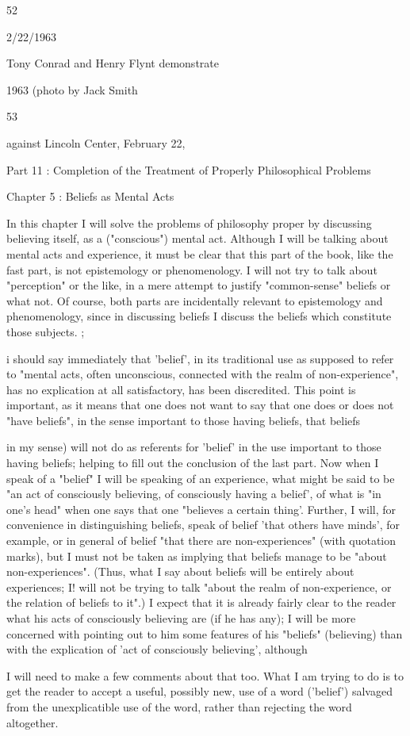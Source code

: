 \documentclass[10pt,twoside]{memoir}
\begin{document}
\begin{enumerate}
{{{{{{{{{{{{{{52 


2/22/1963 


Tony Conrad and Henry Flynt demonstrate 


1963 
(photo by Jack Smith} 


53 


against Lincoln Center, February 22, 


Part 11 : Completion of the Treatment of 
Properly Philosophical Problems 


Chapter 5 : Beliefs as Mental Acts 


In this chapter I will solve the problems of philosophy proper by 
discussing believing itself, as a ("conscious") mental act. Although I will be 
talking about mental acts and experience, it must be clear that this part of 
the book, like the fast part, is not epistemology or phenomenology. I will 
not try to talk about "perception" or the like, in a mere attempt to justify 
"common-sense" beliefs or what not. Of course, both parts are incidentally 
relevant to epistemology and phenomenology, since in discussing beliefs I 
discuss the beliefs which constitute those subjects. ; 

i should say immediately that 'belief', in its traditional use as supposed 
to refer to "mental acts, often unconscious, connected with the realm of 
non-experience", has no explication at all satisfactory, has been discredited. 
This point is important, as it means that one does not want to say that one 
does or does not "have beliefs", in the sense important to those having 
beliefs, that beliefs {in my sense) will not do as referents for 'belief' in the 
use important to those having beliefs; helping to fill out the conclusion of 
the last part. Now when I speak of a "belief" I will be speaking of an 
experience, what might be said to be "an act of consciously believing, of 
consciously having a belief', of what is "in one's head" when one says that 
one "believes a certain thing'. Further, I will, for convenience in 
distinguishing beliefs, speak of belief 'that others have minds', for example, 
or in general of belief "that there are non-experiences" (with quotation 
marks), but I must not be taken as implying that beliefs manage to be 
"about non-experiences". (Thus, what I say about beliefs will be entirely 
about experiences; I! will not be trying to talk "about the realm of 
non-experience, or the relation of beliefs to it".) I expect that it is already 
fairly clear to the reader what his acts of consciously believing are (if he has 
any); I will be more concerned with pointing out to him some features of his 
"beliefs" (believing) than with the explication of 'act of consciously 
believing', although {I will need to make a few comments about that too. 
What I am trying to do is to get the reader to accept a useful, possibly new, 
use of a word ('belief') salvaged from the unexplicatible use of the word, 
rather than rejecting the word altogether. 

}}}}}}}}}}}}}}}
\end{enumerate}
\end{document}
